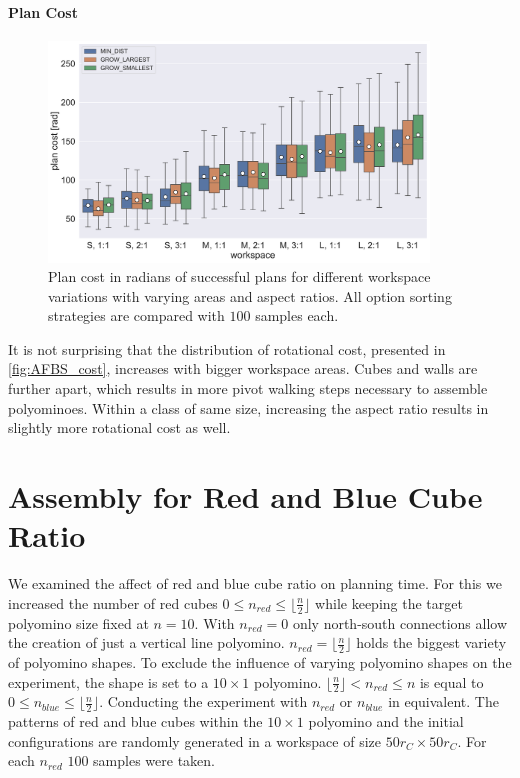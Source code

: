 \paragraph{Plan Cost} 

\begin{figure}
	\centering
	\includegraphics[width=0.9\textwidth]{figures/plots/AFBS_cost.pdf}
	\caption[Plan cost for different workspace variations]{Plan cost in radians of successful plans for different workspace variations with varying areas and aspect ratios. All option sorting strategies are compared with $100$ samples each.}
	\label{fig:AFBS_cost}
\end{figure}

It is not surprising that the distribution of rotational cost, presented in \autoref{fig:AFBS_cost}, increases with bigger workspace areas.
Cubes and walls are further apart, which results in more pivot walking steps necessary to assemble polyominoes.
Within a class of same size, increasing the aspect ratio results in slightly more rotational cost as well.





\section{Assembly for Red and Blue Cube Ratio}
\label{sec:AFNR}

We examined the affect of red and blue cube ratio on planning time.
For this we increased the number of red cubes $0 \leq n_\textit{red} \leq \lfloor \frac{n}{2}\rfloor$ while keeping the target polyomino size fixed at $n = 10$.
With $n_\textit{red} = 0$ only north-south connections allow the creation of just a vertical line polyomino.
$n_\textit{red} = \lfloor \frac{n}{2}\rfloor$ holds the biggest variety of polyomino shapes.
To exclude the influence of varying polyomino shapes on the experiment, the shape is set to a $10 \times 1$ polyomino.
$\lfloor \frac{n}{2}\rfloor < n_\textit{red} \leq n$ is equal to $0 \leq n_\textit{blue} \leq \lfloor \frac{n}{2}\rfloor$.
Conducting the experiment with $n_\textit{red}$ or $n_\textit{blue}$ in equivalent.
The patterns of red and blue cubes within the $10 \times 1$ polyomino and the initial configurations are randomly generated in a workspace of size $50 r_C \times 50 r_C$.
For each $n_\textit{red}$ $100$ samples were taken.

